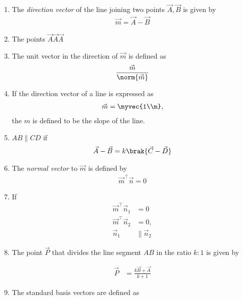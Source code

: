 \begin{enumerate}[label=\thesection.\arabic*.,ref=\thesection.\theenumi]
  \item The {\em direction vector} of the line joining two points $\vec{A},\vec{B}$ is given by 
  \begin{align}
    \label{eq:dir_vec}
    \vec{m} = \vec{A}-\vec{B}
  \end{align}
  \item The points $\vec{A}\vec{A}\vec{A}$
\item The unit vector in the direction of $\vec{m}$ is defined as
\begin{align}
    \frac{\vec{m}}{\norm{\vec{m}}}
\end{align}
\item If the direction vector of a line is expressed as 
		\label{prop:two-dir-vec}
	\begin{align}
		\label{eq:two-dir-vec}
    \vec{m} = \myvec{1\\m},
\end{align}
 the $m$ is defined to be the {\em} slope of the line. 
  \item $AB \parallel CD$ if 
	  \label{prop:two-par-dir-vec}
  \begin{align}
	  \vec{A}- \vec{B}= k\brak{\vec{C}- \vec{D}}
	  \label{eq:two-par-dir-vec}
  \end{align}
  \item The {\em normal vector} to $\vec{m}$ is defined by 
  \begin{align}
    \label{eq:normal_vec}
    \vec{m}^{\top}  \vec{n} = 0
  \end{align}
  \item  If
	  \label{prop:two-orth-para}
\begin{align}
	\vec{m}^{\top}  \vec{n}_1 &= 0
	\\
	\vec{m}^{\top}  \vec{n}_2 &= 0,
	\\
	\vec{n}_1 &\parallel \vec{n}_2
	  \label{eq:two-orth-para}
\end{align}
  \item The point $\vec{P}$ that divides the line segment $AB$ in the ratio $k:1$  is given by 

  \begin{align}
	  \vec{P}&= \frac{k\vec{B}+ \vec{A}}{k+1}
  \end{align}
\item  The standard basis vectors are defined as 
	\label{def:matrix-two}


\end{enumerate}
